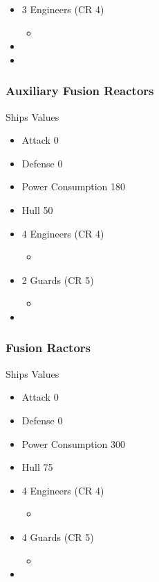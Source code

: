 \documentclass[11pt]{article}
\begin{document}
{\begin{itemize}
\item 3 Engineers (CR 4)
\begin{itemize}
\item {}
\end{itemize}
\item {}
\item {}
\end{itemize}
\subsubsection{Auxiliary Fusion Reactors}
\label{sec:org1b0db31}
Ships Values
\begin{itemize}
\item Attack 0
\item Defense 0
\item Power Consumption 180
\item Hull 50

\item 4 Engineers (CR 4)
\begin{itemize}
\item {}
\end{itemize}
\item 2 Guards (CR 5)
\begin{itemize}
\item {}
\end{itemize}
\item {}
\end{itemize}
\subsubsection{Fusion Ractors}
\label{sec:org3d1c29a}
Ships Values
\begin{itemize}
\item Attack 0
\item Defense 0
\item Power Consumption 300
\item Hull 75

\item 4 Engineers (CR 4)
\begin{itemize}
\item {}
\end{itemize}
\item 4 Guards (CR 5)
\begin{itemize}
\item {}
\end{itemize}
\item {}
\end{itemize}
}
\end{document}
